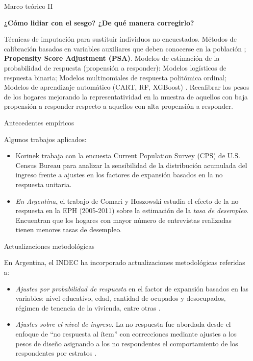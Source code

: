 \documentclass[10pt]{beamer}
\begin{document}
\begin{frame}[fragile]{Marco teórico II}

\rightarrow \textbf{¿Cómo lidiar con el sesgo? ¿De qué manera corregirlo?}

\begin{outline}
    \1 Técnicas de imputación para sustituir individuos no encuestados. Métodos de calibración basados en variables auxiliares que deben conocerse en la población \cite{handbook} \cite{psa_calib_onlinesv};
    \1\textbf{ Propensity Score Adjustment (PSA)}. Modelos de estimación de la probabilidad de respuesta (propensión a responder):
    \2 Modelos logísticos de respuesta binaria; 
    \2 Modelos multinomiales de respuesta politómica ordinal; 
    \2 Modelos de aprendizaje automático (CART, RF, XGBoost) \cite{methodsml}.
    \1 Recalibrar los pesos de los hogares mejorando la representatividad en la muestra de aquellos con baja propensión a responder respecto a aquellos con alta propensión a responder.
\end{outline}

\end{frame}

    
\begin{frame}{Antecedentes empíricos}

Algunos trabajos aplicados:
\begin{itemize}
    \item Korinek \cite{korinek07} trabaja con la encuesta Current Population Survey (CPS) de U.S. Census Bureau para analizar la sensibilidad de la distribución acumulada del ingreso frente a ajustes en los factores de expansión basados en la no respuesta unitaria.
    \item \textit{En Argentina}, el trabajo de Comari y Hoszowski \cite{nonresponsearg} estudia el efecto de la no respuesta en la EPH (2005-2011) sobre la estimación de la \textit{tasa de desempleo}. Encuentran que los hogares con mayor número de entrevistas realizadas tienen menores tasas de desempleo.
\end{itemize}

\end{frame}

\begin{frame}{Actualizaciones metodológicas}

En Argentina, el INDEC ha incorporado actualizaciones metodológicas referidas a:

\begin{itemize}
    \item  \textit{Ajustes por probabilidad de respuesta} en el factor de expansión basados en las variables: nivel educativo, edad, cantidad de ocupados y desocupados, régimen de tenencia de la vivienda, entre otras \cite{indecmetod}.
    \item \textit{Ajustes sobre el nivel de ingreso}. La no respuesta fue abordada desde el enfoque de ``no respuesta al ítem'' con correcciones mediante ajustes a los pesos de diseño asignando a los no respondentes el comportamiento de los respondentes por estratos \cite{indecmetod2}.
\end{itemize}

\end{frame}
\end{document}
